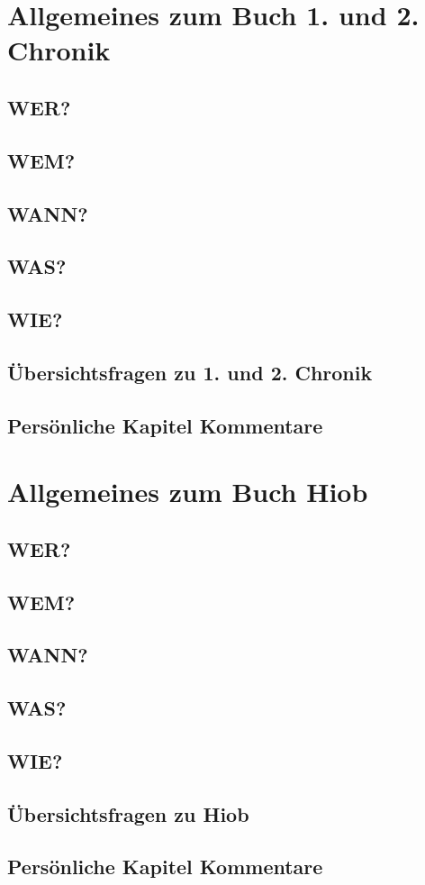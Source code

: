 \section{Allgemeines zum Buch 1. und 2. Chronik}
\subsection{WER?}
\subsection{WEM?}
\subsection{WANN?}
\subsection{WAS?}
\subsection{WIE?}
\subsection{Übersichtsfragen zu 1. und 2. Chronik}
    
\subsection{Persönliche Kapitel Kommentare}
\section{Allgemeines zum Buch Hiob}
\subsection{WER?}
\subsection{WEM?}
\subsection{WANN?}
\subsection{WAS?}
\subsection{WIE?}
\subsection{Übersichtsfragen zu Hiob}
    
\subsection{Persönliche Kapitel Kommentare}



